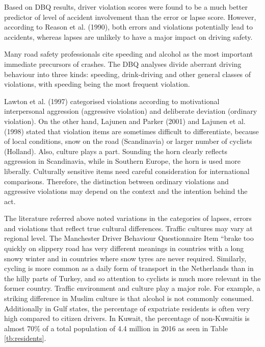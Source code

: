 \documentclass[preprint,12pt,a4paper,authoryear]{elsarticle}
\begin{document}
Based on DBQ results, driver violation scores were found to be a much better predictor of level of accident involvement than the error or lapse score. However, according to Reason et al. (1990), both errors and violations potentially lead to accidents, whereas lapses are unlikely to have a major impact on driving safety.    

Many road safety professionals cite speeding and alcohol as the most important immediate precursors of crashes. The DBQ analyses divide aberrant driving behaviour into three kinds: speeding, drink-driving and other general classes of violations, with speeding being the most frequent violation. 

Lawton et al. (1997) categorised violations according to motivational interpersonal aggression (aggressive violation) and deliberate deviation (ordinary violation). On the other hand, Lajunen and Parker (2001) and Lajunen et al. (1998) stated that violation items are sometimes difficult to differentiate, because of local conditions, snow on the road (Scandinavia) or larger number of cyclists (Holland). Also, culture plays a part. Sounding the horn clearly reflects aggression in Scandinavia, while in Southern Europe, the horn is used more liberally. Culturally sensitive items need careful consideration for international comparisons. Therefore, the distinction between ordinary violations and aggressive violations may depend on the context and the intention behind the act.   

The literature referred above noted variations in the categories of lapses, errors and violations that reflect true cultural differences. Traffic cultures may vary at regional level. The Manchester Driver Behaviour Questionnaire Item “brake too quickly on slippery road has very different meanings in countries with a long snowy winter and in countries where snow tyres are never required. Similarly, cycling is more common as a daily form of transport in the Netherlands than in the hilly parts of Turkey, and so attention to cyclists is much more relevant in the former country. Traffic environment and culture play a major role. For example, a striking difference in Muslim culture is that alcohol is not commonly consumed.  Additionally in Gulf states, the percentage of expatriate residents is often very high compared to citizen drivers. In Kuwait, the percentage of non-Kuwaitis is almost 70\% of a total population of 4.4 million in 2016 as seen in Table \ref{tb:residents}.
\end{document}
